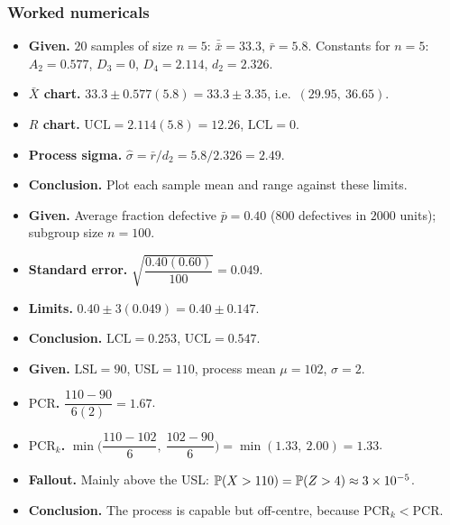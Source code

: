 \subsubsection*{Worked numericals}

\begin{example}
\begin{itemize}
  \item \textbf{Given.} $20$ samples of size $n=5$: $\bar{\bar{x}}=33.3$, $\bar{r}=5.8$. Constants for $n=5$: $A_2=0.577$, $D_3=0$, $D_4=2.114$, $d_2=2.326$.
  \item \textbf{$\bar{X}$ chart.} $33.3\pm0.577(5.8)=33.3\pm3.35$, i.e.\ $(29.95,\ 36.65)$.
  \item \textbf{$R$ chart.} $\mathrm{UCL}=2.114(5.8)=12.26$, $\mathrm{LCL}=0$.
  \item \textbf{Process sigma.} $\hat\sigma=\bar{r}/d_2=5.8/2.326=2.49$.
  \item \textbf{Conclusion.} Plot each sample mean and range against these limits.
\end{itemize}
\end{example}

\begin{example}
\begin{itemize}
  \item \textbf{Given.} Average fraction defective $\bar{p}=0.40$ ($800$ defectives in $2000$ units); subgroup size $n=100$.
  \item \textbf{Standard error.} $\sqrt{\dfrac{0.40(0.60)}{100}}=0.049$.
  \item \textbf{Limits.} $0.40\pm3(0.049)=0.40\pm0.147$.
  \item \textbf{Conclusion.} $\mathrm{LCL}=0.253$, $\mathrm{UCL}=0.547$.
\end{itemize}
\end{example}

\begin{example}
\begin{itemize}
  \item \textbf{Given.} $\mathrm{LSL}=90$, $\mathrm{USL}=110$, process mean $\mu=102$, $\sigma=2$.
  \item \textbf{$\mathrm{PCR}$.} $\dfrac{110-90}{6(2)}=1.67$.
  \item \textbf{$\mathrm{PCR}_k$.} $\min\Big(\dfrac{110-102}{6},\ \dfrac{102-90}{6}\Big)=\min(1.33,\ 2.00)=1.33$.
  \item \textbf{Fallout.} Mainly above the USL: $\mathbb{P}(X>110)=\mathbb{P}(Z>4)\approx3\times10^{-5}$.
  \item \textbf{Conclusion.} The process is capable but off-centre, because $\mathrm{PCR}_k<\mathrm{PCR}$.
\end{itemize}
\end{example}


